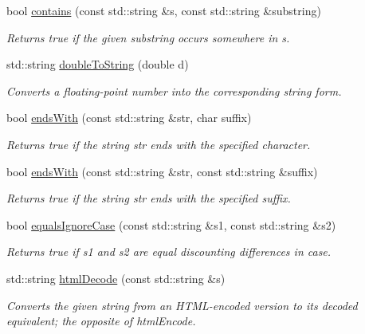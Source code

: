 \begin{DoxyCompactItemize}
bool \mbox{\hyperlink{namespacesgl_1_1priv_1_1strlib_aa15d39098819490cce8293e470e5ef36}{contains}} (const std\+::string \&s, const std\+::string \&substring)
\begin{DoxyCompactList}\small\item\em Returns true if the given substring occurs somewhere in s. \end{DoxyCompactList}\item 
std\+::string \mbox{\hyperlink{namespacesgl_1_1priv_1_1strlib_a93b653853091dcbcb8d6f7ae75b48720}{double\+To\+String}} (double d)
\begin{DoxyCompactList}\small\item\em Converts a floating-\/point number into the corresponding string form. \end{DoxyCompactList}\item 
bool \mbox{\hyperlink{namespacesgl_1_1priv_1_1strlib_af69d242dc4439ee48dc41d92fe604fd7}{ends\+With}} (const std\+::string \&str, char suffix)
\begin{DoxyCompactList}\small\item\em Returns {\ttfamily true} if the string {\ttfamily str} ends with the specified character. \end{DoxyCompactList}\item 
bool \mbox{\hyperlink{namespacesgl_1_1priv_1_1strlib_a713373507ec8485d5466e3f4fcdaefa1}{ends\+With}} (const std\+::string \&str, const std\+::string \&suffix)
\begin{DoxyCompactList}\small\item\em Returns {\ttfamily true} if the string {\ttfamily str} ends with the specified suffix. \end{DoxyCompactList}\item 
bool \mbox{\hyperlink{namespacesgl_1_1priv_1_1strlib_a4aad54fd1c2e01c5d3e243aecf4a4e1e}{equals\+Ignore\+Case}} (const std\+::string \&s1, const std\+::string \&s2)
\begin{DoxyCompactList}\small\item\em Returns {\ttfamily true} if {\ttfamily s1} and {\ttfamily s2} are equal discounting differences in case. \end{DoxyCompactList}\item 
std\+::string \mbox{\hyperlink{namespacesgl_1_1priv_1_1strlib_a166b00da7243e2a911bffeafceeab62d}{html\+Decode}} (const std\+::string \&s)
\begin{DoxyCompactList}\small\item\em Converts the given string from an H\+T\+M\+L-\/encoded version to its decoded equivalent; the opposite of html\+Encode. \end{DoxyCompactList}\item 

\end{DoxyCompactItemize}

